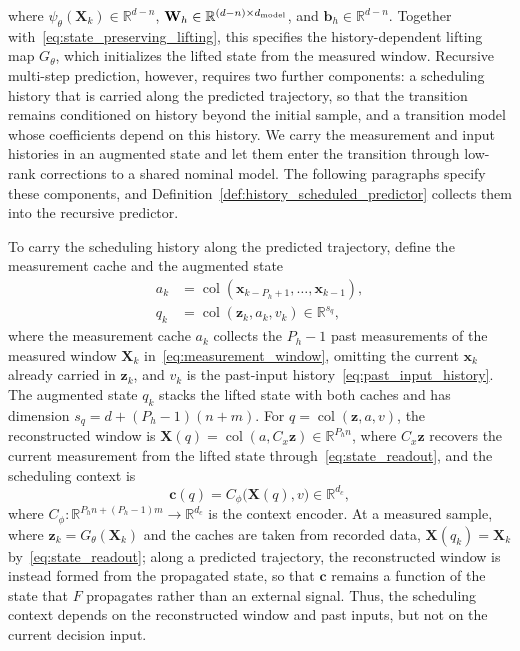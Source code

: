\documentclass[journal]{IEEEtran}
\theoremstyle{plain}
\theoremstyle{definition}
\newcommand{\vb}{\mathbf{b}}
\newcommand{\vx}{\mathbf{x}}
\newcommand{\vz}{\mathbf{z}}
\newcommand{\vc}{\mathbf{c}}
\newcommand{\mW}{\mathbf{W}}
\newcommand{\mX}{\mathbf{X}}
\newcommand{\R}{\mathbb{R}}
\newcommand{\col}{\operatorname{col}}
\begin{document}
where $\psi_\theta(\mX_k)\in\R^{d-n}$, $\mW_h\in\R^{(d-n)\times d_{\rm model}}$, and $\vb_h\in\R^{d-n}$. Together with~\eqref{eq:state_preserving_lifting}, this specifies the history-dependent lifting map $G_\theta$, which initializes the lifted state from the measured window. Recursive multi-step prediction, however, requires two further components: a scheduling history that is carried along the predicted trajectory, so that the transition remains conditioned on history beyond the initial sample, and a transition model whose coefficients depend on this history. We carry the measurement and input histories in an augmented state and let them enter the transition through low-rank corrections to a shared nominal model. The following paragraphs specify these components, and Definition~\ref{def:history_scheduled_predictor} collects them into the recursive predictor.

To carry the scheduling history along the predicted trajectory, define the measurement cache and the augmented state
\begin{equation}
\begin{aligned}
a_k&=\col(\vx_{k-P_h+1},\ldots,\vx_{k-1}),\\
q_k&=\col(\vz_k,a_k,v_k)\in\R^{s_q},
\end{aligned}
\label{eq:augmented_state}
\end{equation}
where the measurement cache $a_k$ collects the $P_h-1$ past measurements of the measured window $\mX_k$ in~\eqref{eq:measurement_window}, omitting the current $\vx_k$ already carried in $\vz_k$, and $v_k$ is the past-input history~\eqref{eq:past_input_history}. The augmented state $q_k$ stacks the lifted state with both caches and has dimension $s_q=d+(P_h-1)(n+m)$. For $q=\col(\vz,a,v)$, the reconstructed window is $\mX(q)=\col(a,C_x\vz)\in\R^{P_hn}$, where $C_x\vz$ recovers the current measurement from the lifted state through~\eqref{eq:state_readout}, and the scheduling context is
\begin{equation}
\vc(q)=C_\phi\bigl(\mX(q),v\bigr)\in\R^{d_c},
\label{eq:recursive_context}
\end{equation}
where $C_\phi:\R^{P_hn+(P_h-1)m}\to\R^{d_c}$ is the context encoder. At a measured sample, where $\vz_k=G_\theta(\mX_k)$ and the caches are taken from recorded data, $\mX(q_k)=\mX_k$ by~\eqref{eq:state_readout}; along a predicted trajectory, the reconstructed window is instead formed from the propagated state, so that $\vc$ remains a function of the state that $F$ propagates rather than an external signal. Thus, the scheduling context depends on the reconstructed window and past inputs, but not on the current decision input.
\end{document}
